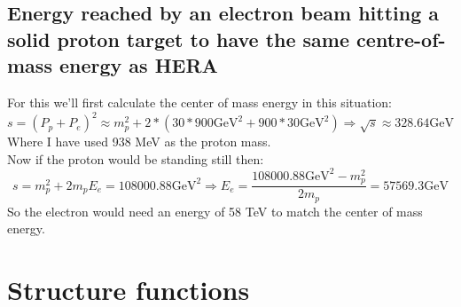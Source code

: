 \documentclass[10pt,a4paper,twoside]{article}
\begin{document}
\subsection{Energy reached by an electron beam hitting a solid proton target to have the same centre-of-mass energy as HERA}
For this we'll first calculate the center of mass energy in this situation:
\begin{equation}
	s = (P_p + P_e)^2 \approx m_p^2 + 2*(30*900 \text{GeV}^2 + 900*30 \text{GeV}^2) \Rightarrow \sqrt{s} \approx 328.64\text{GeV}
\end{equation}
Where I have used 938 MeV as the proton mass\cite{mohr_2016}.\\
Now if the proton would be standing still then:
\begin{equation}
	s = m_p^2 + 2m_pE_e = 108000.88\text{GeV}^2\Rightarrow E_e = \frac{108000.88\text{GeV}^2- m_p^2}{2m_p} = 57569.3\text{GeV}
\end{equation}
So the electron would need an energy of 58 TeV to match the center of mass energy.

\section*{Structure functions}
\end{document}
